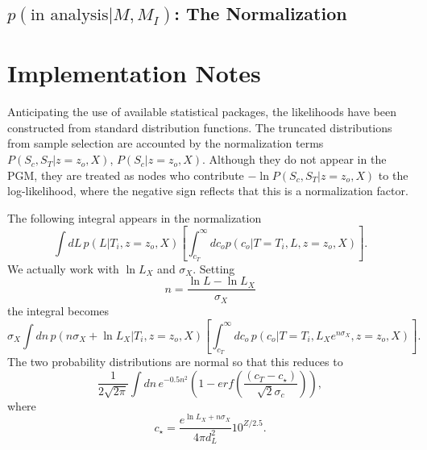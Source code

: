 \documentclass[preprint,3p]{elsarticle}
\begin{document}
\subsection{$p(\text{in analysis}|M, M_I)$: The Normalization}

\section{Implementation Notes}
Anticipating the use of available statistical packages, the likelihoods have been constructed
from standard distribution functions.  The truncated distributions from sample selection
are accounted by the normalization 
terms $P(S_c, S_T| z=z_o, X)$, $P(S_c| z=z_o, X)$.  Although they do not appear
in the PGM, they are treated as nodes who contribute 
$-\ln{P(S_c, S_T| z=z_o, X)}$ to the log-likelihood, where the negative sign reflects that this is a normalization
factor.


The following integral appears in the normalization
\begin{equation}
\int dL\, p(L|T_i, z=z_o, X)  \left[\int_{c_T}^{\infty} dc_o  p(c_o | T=T_i, L, z=z_o, X)\right].
\end{equation}
We actually work with $\ln{L_X}$ and $\sigma_X$.  Setting
\begin{equation}
n=\frac{\ln{L}-\ln{L_X}}{\sigma_X}
\end{equation}
the integral becomes
 \begin{equation}
\sigma_X \int dn\, p(n\sigma_X + \ln{L_X} |T_i, z=z_o, X)  \left[\int_{c_T}^{\infty} dc_o\,  p(c_o | T=T_i, L_Xe^{n\sigma_X}, z=z_o, X)\right].
\end{equation}
The two probability distributions are normal so that this reduces to
 \begin{equation}
\frac{1}{2\sqrt{2\pi}} \int dn\, e^{-0.5n^2} \left(1-erf\left(\frac{(c_T - c_\star)}{\sqrt{2}\sigma_c}\right)\right),
\end{equation}
where
\begin{equation}
c_\star = \frac{e^{\ln{L_X}+n\sigma_X}}{4\pi d_L^2}10^{Z/2.5}.
\end{equation}
\end{document}
